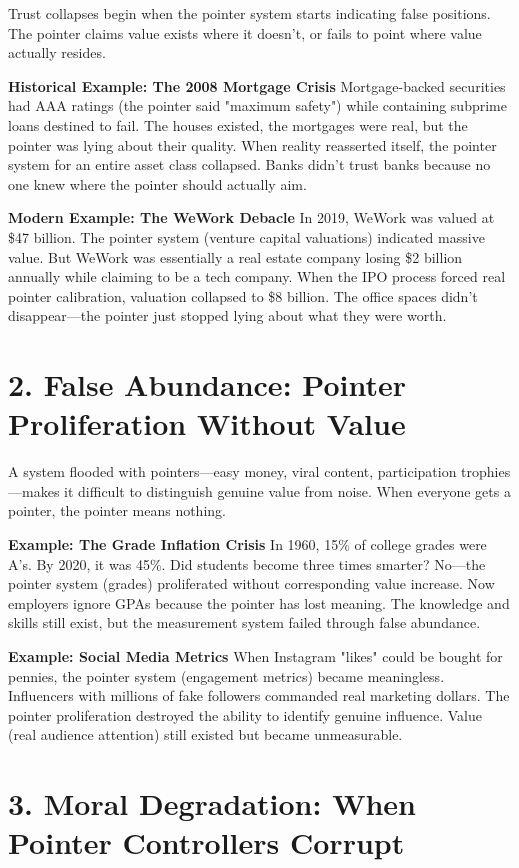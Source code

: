 \documentclass[11pt,oneside]{book}
\begin{document}
Trust collapses begin when the pointer system starts indicating false positions. The pointer claims value exists where it doesn't, or fails to point where value actually resides.

\textbf{Historical Example: The 2008 Mortgage Crisis}
Mortgage-backed securities had AAA ratings (the pointer said "maximum safety") while containing subprime loans destined to fail. The houses existed, the mortgages were real, but the pointer was lying about their quality. When reality reasserted itself, the pointer system for an entire asset class collapsed. Banks didn't trust banks because no one knew where the pointer should actually aim.

\textbf{Modern Example: The WeWork Debacle}
In 2019, WeWork was valued at \$47 billion. The pointer system (venture capital valuations) indicated massive value. But WeWork was essentially a real estate company losing \$2 billion annually while claiming to be a tech company. When the IPO process forced real pointer calibration, valuation collapsed to \$8 billion. The office spaces didn't disappear—the pointer just stopped lying about what they were worth.
\section{2. False Abundance: Pointer Proliferation Without Value}

A system flooded with pointers—easy money, viral content, participation trophies—makes it difficult to distinguish genuine value from noise. When everyone gets a pointer, the pointer means nothing.

\textbf{Example: The Grade Inflation Crisis}
In 1960, 15\% of college grades were A's. By 2020, it was 45\%. Did students become three times smarter? No—the pointer system (grades) proliferated without corresponding value increase. Now employers ignore GPAs because the pointer has lost meaning. The knowledge and skills still exist, but the measurement system failed through false abundance.

\textbf{Example: Social Media Metrics}
When Instagram "likes" could be bought for pennies, the pointer system (engagement metrics) became meaningless. Influencers with millions of fake followers commanded real marketing dollars. The pointer proliferation destroyed the ability to identify genuine influence. Value (real audience attention) still existed but became unmeasurable.

\section{3. Moral Degradation: When Pointer Controllers Corrupt}
\end{document}
